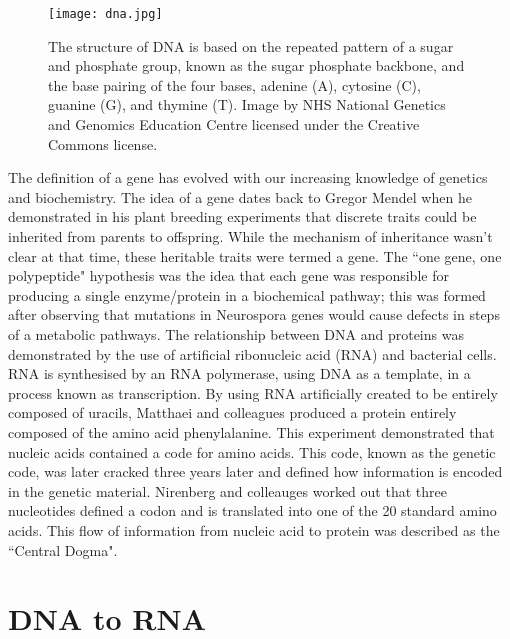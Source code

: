 \begin{figure}[h]
   \centering
   \texttt{[image: dna.jpg]}
   \caption[The structure of DNA]{The structure of DNA is based on the repeated pattern of a sugar and phosphate group, known as the sugar phosphate backbone, and the base pairing of the four bases, adenine (A), cytosine (C), guanine (G), and thymine (T). Image by NHS National Genetics and Genomics Education Centre licensed under the Creative Commons license.}
   \label{fig:dna}
\end{figure}

The definition of a gene has evolved with our increasing knowledge of genetics and biochemistry\cite{pmid17567988}. The idea of a gene dates back to Gregor Mendel when he demonstrated in his plant breeding experiments that discrete traits could be inherited from parents to offspring. While the mechanism of inheritance wasn't clear at that time, these heritable traits were termed a gene. The ``one gene, one polypeptide" hypothesis was the idea that each gene was responsible for producing a single enzyme/protein in a biochemical pathway; this was formed after observing that mutations in Neurospora genes would cause defects in steps of a metabolic pathways\cite{pmid16578042}. The relationship between DNA and proteins was demonstrated by the use of artificial ribonucleic acid (RNA) and bacterial cells\cite{pmid14471390}. RNA is synthesised by an RNA polymerase, using DNA as a template, in a process known as transcription. By using RNA artificially created to be entirely composed of uracils, Matthaei and colleagues produced a protein entirely composed of the amino acid phenylalanine. This experiment demonstrated that nucleic acids contained a code for amino acids. This code, known as the genetic code, was later cracked three years later\cite{pmid5330357} and defined how information is encoded in the genetic material. Nirenberg and colleauges worked out that three nucleotides defined a codon and is translated into one of the 20 standard amino acids. This flow of information from nucleic acid to protein was described as the ``Central Dogma"\cite{crick1958protein}.

\section{DNA to RNA}


